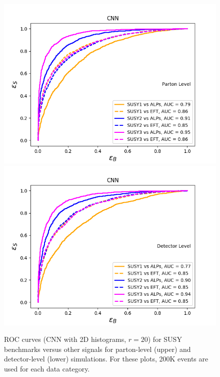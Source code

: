 \documentclass[prd,aps,letterpaper,floatfix,superscriptaddress,preprintnumbers,twocolumn,10pt,nofootinbib]{revtex4-1}
\begin{document}
\begin{figure}%
\centering
\includegraphics[scale=0.50]{figures/2D_CNN_SUSY_vs_sig_LO_ROC.png}
\includegraphics[scale=0.50]{figures/2D_CNN_SUSY_vs_sig_delphes_ROC.png}
\caption{ROC curves (CNN with 2D histograms, $r = 20$) for SUSY benchmarks versus other signals for  parton-level (upper) and detector-level (lower) simulations. For these plots, 200K events are used for each data category.}\label{2D_CNN_SUSY_vs_sig_LO_ROC}
\end{figure}
\end{document}
